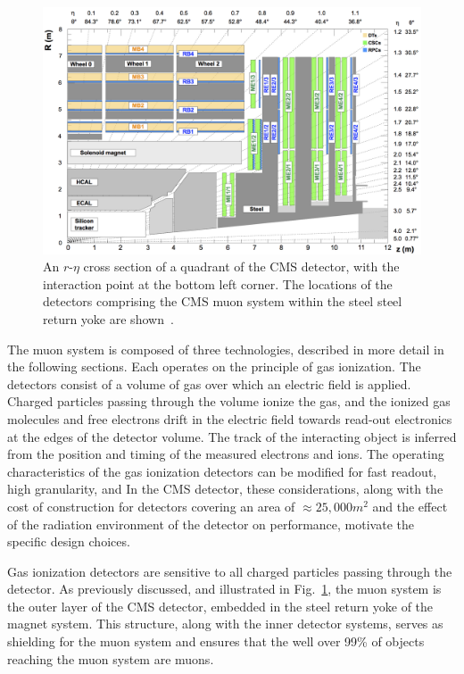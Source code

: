 \begin{figure}[htbp]
  \centering
   \includegraphics[width=\textwidth]{figures/LHCandCMS/MuonSystemGeometry.png}
  \caption[An $r$-$\eta$ cross section of a quadrant of the CMS detector]{
    An $r$-$\eta$ cross section of a quadrant of the CMS detector, with the interaction
    point at the bottom left corner. The locations of the detectors
    comprising the CMS muon system within the steel steel return yoke
    are shown~\cite{Chatrchyan:2012xdj}.
        }
 \label{fig:muonSystemGeo}
\end{figure}

The muon system is composed of three technologies, 
described in more detail in the following sections. 
Each operates on the principle of gas ionization. 
The detectors consist of a volume of 
gas over which an electric field is applied. Charged
particles passing through the volume ionize the gas, and the ionized gas molecules
and free electrons drift in the electric field towards read-out electronics at the 
edges of the detector volume. The track of the interacting object is inferred from
the position and timing of the measured electrons and ions.
The operating characteristics of the gas ionization detectors can be modified
for fast readout, high granularity, and 
In the CMS detector, these considerations, along with the cost of construction 
for detectors covering an area of $\approx 25,000\unit{m}^2$ and 
the effect of the radiation environment of the detector on performance, motivate
the specific design choices.

Gas ionization detectors are
sensitive to all charged particles passing through the detector. As previously discussed,
and illustrated in Fig.~\ref{fig:muonSystemGeo}, the muon system is 
the outer layer of the CMS detector, embedded in
the steel return yoke of the magnet system. This structure, along with the inner
detector systems, serves as shielding for the muon system and ensures that the 
well over 99\% of objects reaching the muon system are muons.

